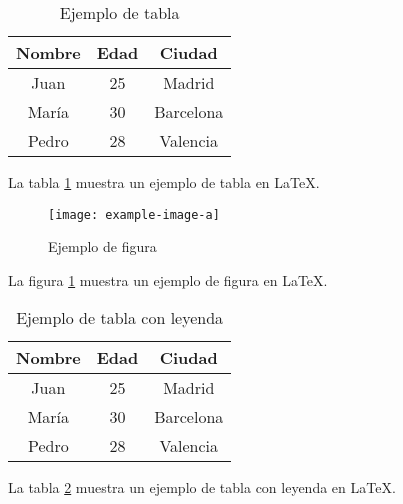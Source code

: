\documentclass{article}
\begin{document}
\begin{table}[h]
	\centering
	\begin{tabular}{|c|c|c|}
		\hline
		Nombre & Edad & Ciudad \\
		\hline
		Juan & 25 & Madrid \\
		María & 30 & Barcelona \\
		Pedro & 28 & Valencia \\
		\hline
	\end{tabular}
	\caption{Ejemplo de tabla}
	\label{tab:ejemplo}
\end{table}
La tabla \ref{tab:ejemplo} muestra un ejemplo de tabla en LaTeX.

\begin{figure}[h]
	\centering
	\texttt{[image: example-image-a]}
	\caption{Ejemplo de figura}
	\label{fig:ejemplo}
\end{figure}
La figura \ref{fig:ejemplo} muestra un ejemplo de figura en LaTeX.

\begin{table}[h]
	\centering
	\begin{tabular}{|c|c|c|}
		\hline
		Nombre & Edad & Ciudad \\
		\hline
		Juan & 25 & Madrid \\
		María & 30 & Barcelona \\
		Pedro & 28 & Valencia \\
		\hline
	\end{tabular}
	\caption{Ejemplo de tabla con leyenda}
	\label{tab:leyenda}
\end{table}
La tabla \ref{tab:leyenda} muestra un ejemplo de tabla con leyenda en LaTeX.
\end{document}
